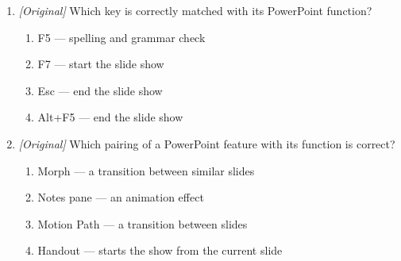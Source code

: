 \documentclass[11pt]{article}
\begin{document}
\begin{enumerate}[label=\textbf{Q\arabic*.}, leftmargin=*]
\begin{enumerate}[label=\Alph*.]
    \item open Presenter View
  \end{enumerate}
\item \textit{[Original]} Which key is correctly matched with its PowerPoint
  function?
  \begin{enumerate}[label=\Alph*.]
    \item F5 --- spelling and grammar check
    \item F7 --- start the slide show
    \item Esc --- end the slide show
    \item Alt+F5 --- end the slide show
  \end{enumerate}
\item \textit{[Original]} Which pairing of a PowerPoint feature with its function
  is correct?
  \begin{enumerate}[label=\Alph*.]
    \item Morph --- a transition between similar slides
    \item Notes pane --- an animation effect
    \item Motion Path --- a transition between slides
    \item Handout --- starts the show from the current slide
  \end{enumerate}


\end{enumerate}
\end{document}
